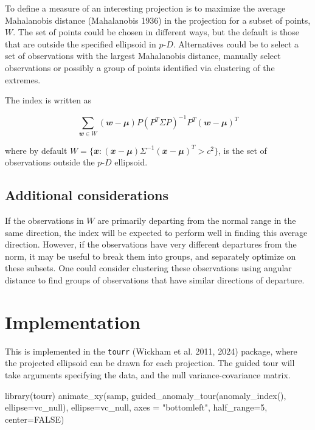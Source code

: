 \documentclass[
  12pt,
]{interact}
\newenvironment{Shaded}{\begin{snugshade}}{\end{snugshade}}
\newcommand{\AttributeTok}[1]{\textcolor[rgb]{0.40,0.45,0.13}{#1}}
\newcommand{\ConstantTok}[1]{\textcolor[rgb]{0.56,0.35,0.01}{#1}}
\newcommand{\DecValTok}[1]{\textcolor[rgb]{0.68,0.00,0.00}{#1}}
\newcommand{\FunctionTok}[1]{\textcolor[rgb]{0.28,0.35,0.67}{#1}}
\newcommand{\NormalTok}[1]{\textcolor[rgb]{0.00,0.23,0.31}{#1}}
\newcommand{\StringTok}[1]{\textcolor[rgb]{0.13,0.47,0.30}{#1}}
\newcommand\pD{$p\text{-}D$}
\begin{document}
To define a measure of an interesting projection is to maximize the
average Mahalanobis distance (Mahalanobis 1936) in the projection for a
subset of points, \(W\). The set of points could be chosen in different
ways, but the default is those that are outside the specified ellipsoid
in \pD{}. Alternatives could be to select a set of observations with the
largest Mahalanobis distance, manually select observations or possibly a
group of points identified via clustering of the extremes.

The index is written as

\[
\sum_{\mathbfit{w} \in W} (\mathbfit{w} - \mathbfit{\mu}) P (P^T\Sigma P)^{-1}P^T(\mathbfit{w} - \mathbfit{\mu})^T
\]

where by default
\(W = \{\mathbfit{x}: (\mathbfit{x}-\mathbfit{\mu}) \Sigma^{-1}(\mathbfit{x}-\mathbfit{\mu})^T > c^2\}\),
is the set of observations outside the \pD{} ellipsoid.

\subsection{Additional considerations}\label{additional-considerations}

If the observations in \(W\) are primarily departing from the normal
range in the same direction, the index will be expected to perform well
in finding this average direction. However, if the observations have
very different departures from the norm, it may be useful to break them
into groups, and separately optimize on these subsets. One could
consider clustering these observations using angular distance to find
groups of observations that have similar directions of departure.

\section{Implementation}\label{sec-implementation}

This is implemented in the \texttt{tourr} (Wickham et al. 2011, 2024)
package, where the projected ellipsoid can be drawn for each projection.
The guided tour will take arguments specifying the data, and the null
variance-covariance matrix.

\begin{Shaded}
\begin{Highlighting}[]
\FunctionTok{library}\NormalTok{(tourr)}
\FunctionTok{animate\_xy}\NormalTok{(samp, }\FunctionTok{guided\_anomaly\_tour}\NormalTok{(}\FunctionTok{anomaly\_index}\NormalTok{(),}
  \AttributeTok{ellipse=}\NormalTok{vc\_null), }\AttributeTok{ellipse=}\NormalTok{vc\_null, }
  \AttributeTok{axes =} \StringTok{"bottomleft"}\NormalTok{, }\AttributeTok{half\_range=}\DecValTok{5}\NormalTok{, }\AttributeTok{center=}\ConstantTok{FALSE}\NormalTok{)}
\end{Highlighting}
\end{Shaded}
\end{document}
